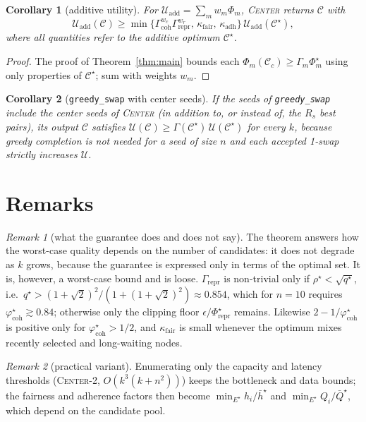 \documentclass[10pt]{article}
\newtheorem{corollary}{Corollary}
\theoremstyle{remark}
\newtheorem{remark}{Remark}
\theoremstyle{definition}
\newcommand{\coh}{\varphi_{\text{coh}}}
\newcommand{\C}{\mathcal{C}}
\begin{document}
\begin{corollary}[additive utility]
For $\mathcal{U}_{\text{add}} = \sum_m w_m \Phi_m$, \textsc{Center} returns $\C$ with
\[
\mathcal{U}_{\text{add}}(\C) \ge \min\{\Gamma_{\text{coh}}^{w_c}\Gamma_{\text{repr}}^{w_r},\, \kappa_{\text{fair}},\,
\kappa_{\text{adh}}\}\, \mathcal{U}_{\text{add}}(\C^\star),
\]
where all quantities refer to the additive optimum $\C^\star$.
\end{corollary}
\begin{proof}
The proof of Theorem~\ref{thm:main} bounds each $\Phi_m(\C_c) \ge \Gamma_m \Phi_m^\star$ using only properties of
$\C^\star$; sum with weights $w_m$.
\end{proof}

\begin{corollary}[\texttt{greedy\_swap} with center seeds]
If the seeds of \texttt{greedy\_swap} include the center seeds of \textsc{Center} (in addition to, or instead of, the
$R_s$ best pairs), its output $\C$ satisfies $\mathcal{U}(\C) \ge \Gamma(\C^\star)\,\mathcal{U}(\C^\star)$ for every
$k$, because greedy completion is not needed for a seed of size $n$ and each accepted 1-swap strictly increases
$\mathcal{U}$.
\end{corollary}

\section{Remarks}

\begin{remark}[what the guarantee does and does not say]
The theorem answers how the worst-case quality depends on the number of candidates: it does not degrade as $k$
grows, because the guarantee is expressed only in terms of the optimal set. It is, however, a worst-case bound and is
loose. $\Gamma_{\text{repr}}$ is non-trivial only if $\rho^\star < \sqrt{q^\star}$, i.e.\ $q^\star > (1+\sqrt2)^2 /
(1 + (1+\sqrt2)^2) \approx 0.854$, which for $n = 10$ requires $\coh^\star \gtrsim 0.84$; otherwise only the clipping
floor $\epsilon/\Phi^\star_{\text{repr}}$ remains. Likewise $2 - 1/\coh^\star$ is positive only for $\coh^\star >
1/2$, and $\kappa_{\text{fair}}$ is small whenever the optimum mixes recently selected and long-waiting nodes.
\end{remark}

\begin{remark}[practical variant]
Enumerating only the capacity and latency thresholds (\textsc{Center-2}, $O(k^3(k + n^2))$) keeps the bottleneck and
data bounds; the fairness and adherence factors then become $\min_{E^\star} h_i / \bar{h}^\star$ and $\min_{E^\star}
Q_i/\bar{Q}^\star$, which depend on the candidate pool.
\end{remark}
\end{document}
